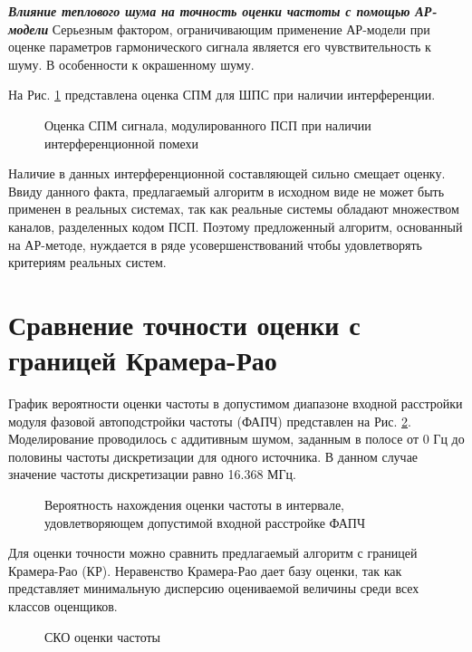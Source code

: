 {\bf{\textit{Влияние теплового шума на точность оценки частоты с помощью АР-модели}}}
Серьезным фактором, ограничивающим применение АР-модели при оценке параметров гармонического сигнала является
его чувствительность к шуму. В особенности к окрашенному шуму.

На Рис. \ref{pic:lpc_psd_2} представлена оценка СПМ для ШПС при наличии интерференции.
\begin{figure}[h]
	\center{}
	\caption{Оценка СПМ сигнала, модулированного ПСП при наличии интерференционной помехи}
	\label{pic:lpc_psd_2}
\end{figure}

Наличие в данных интерференционной составляющей сильно смещает оценку. Ввиду данного факта, предлагаемый алгоритм в исходном виде
не может быть применен в реальных системах, так как реальные системы обладают множеством каналов, разделенных кодом ПСП. Поэтому предложенный алгоритм,
основанный на \mbox{АР-методе}, нуждается в ряде усовершенствований чтобы удовлетворять критериям реальных систем.

\section{Сравнение точности оценки с границей Крамера-Рао}
График вероятности оценки частоты в допустимом диапазоне входной расстройки модуля фазовой автоподстройки частоты (ФАПЧ) представлен на Рис.
\ref{pic:lpc_for_1_probability}. Моделирование проводилось с аддитивным шумом, заданным в полосе от 0 Гц до
половины частоты дискретизации для одного источника. В данном случае значение частоты дискретизации равно 16.368 МГц.
\begin{figure}[H]
\center{}
	\caption{Вероятность нахождения оценки частоты в интервале, удовлетворяющем допустимой входной расстройке ФАПЧ}
	\label{pic:lpc_for_1_probability}
\end{figure}

Для оценки точности можно сравнить предлагаемый алгоритм с границей Крамера-Рао (КР). Неравенство Крамера-Рао дает базу оценки, так
как представляет минимальную дисперсию оцениваемой величины среди всех классов оценщиков.
\begin{figure}[H]
\center{}
	\caption{СКО оценки частоты}
	\label{pic:crlb_vs_1sat_algo}
\end{figure}

